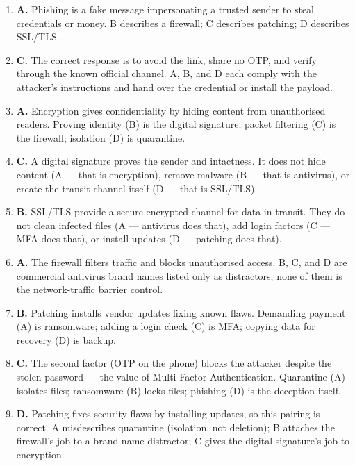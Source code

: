 \begin{enumerate}[label=\textbf{Q\arabic*.}, leftmargin=*]
  recovery; encryption for sending (D) protects it in transit.
\item \textbf{A.} Phishing is a fake message impersonating a trusted sender
  to steal credentials or money. B describes a firewall; C describes
  patching; D describes SSL/TLS.
\item \textbf{C.} The correct response is to avoid the link, share no OTP,
  and verify through the known official channel. A, B, and D each comply
  with the attacker's instructions and hand over the credential or install
  the payload.
\item \textbf{A.} Encryption gives confidentiality by hiding content from
  unauthorised readers. Proving identity (B) is the digital signature;
  packet filtering (C) is the firewall; isolation (D) is quarantine.
\item \textbf{C.} A digital signature proves the sender and intactness. It
  does not hide content (A --- that is encryption), remove malware (B ---
  that is antivirus), or create the transit channel itself (D --- that is
  SSL/TLS).
\item \textbf{B.} SSL/TLS provide a secure encrypted channel for data in
  transit. They do not clean infected files (A --- antivirus does that),
  add login factors (C --- MFA does that), or install updates (D ---
  patching does that).
\item \textbf{A.} The firewall filters traffic and blocks unauthorised
  access. B, C, and D are commercial antivirus brand names listed only as
  distractors; none of them is the network-traffic barrier control.
\item \textbf{B.} Patching installs vendor updates fixing known flaws.
  Demanding payment (A) is ransomware; adding a login check (C) is MFA;
  copying data for recovery (D) is backup.
\item \textbf{C.} The second factor (OTP on the phone) blocks the attacker
  despite the stolen password --- the value of Multi-Factor
  Authentication. Quarantine (A) isolates files; ransomware (B) locks
  files; phishing (D) is the deception itself.
\item \textbf{D.} Patching fixes security flaws by installing updates, so
  this pairing is correct. A misdescribes quarantine (isolation, not
  deletion); B attaches the firewall's job to a brand-name distractor;
  C gives the digital signature's job to encryption.


\end{enumerate}
